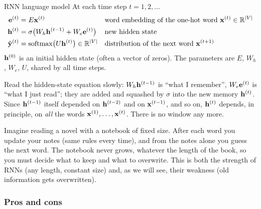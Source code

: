 \begin{nbdef}{RNN language model}
At each time step $t = 1, 2, \ldots$
\begin{align*}
  \mathbf{e}^{(t)} &= E \mathbf{x}^{(t)}
      && \text{word embedding of the one-hot word } \mathbf{x}^{(t)} \in \mathbb R^{|V|}\\
  \mathbf{h}^{(t)} &= \sigma\bigl(W_h \mathbf{h}^{(t-1)} + W_e \mathbf{e}^{(t)}\bigr)
      && \text{new hidden state} \\
  \hat{\mathbf{y}}^{(t)} &= \operatorname{softmax}\bigl(U \mathbf{h}^{(t)}\bigr) \in \mathbb R^{|V|}
      && \text{distribution of the next word } \mathbf{x}^{(t+1)}
\end{align*}
$\mathbf{h}^{(0)}$ is an initial hidden state (often a vector of zeros). The parameters are
$E$, $W_h$, $W_e$, $U$, shared by all time steps.
\end{nbdef}

Read the hidden-state equation slowly: $W_h \mathbf{h}^{(t-1)}$ is ``what I remember'',
$W_e \mathbf{e}^{(t)}$ is ``what I just read''; they are added and squashed by $\sigma$ into
the new memory $\mathbf{h}^{(t)}$. Since $\mathbf{h}^{(t-1)}$ itself depended on
$\mathbf{h}^{(t-2)}$ and on $\mathbf{x}^{(t-1)}$, and so on, $\mathbf{h}^{(t)}$ depends, in
principle, on \emph{all} the words $\mathbf{x}^{(1)}, \ldots, \mathbf{x}^{(t)}$. There is no
window any more.

\begin{nbintuition}
\notinslides
Imagine reading a novel with a notebook of fixed size. After each word you update your
notes (same rules every time), and from the notes alone you guess the next word. The
notebook never grows, whatever the length of the book, so you must decide what to keep
and what to overwrite. This is both the strength of RNNs (any length, constant size)
and, as we will see, their weakness (old information gets overwritten).
\end{nbintuition}

\subsubsection{Pros and cons}

